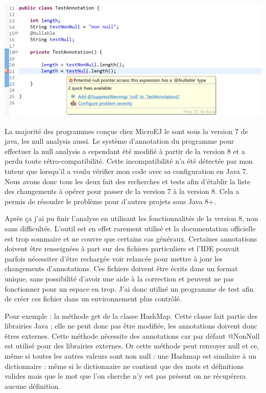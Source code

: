 \documentclass[french,a4paper,12pt]{report}
\begin{document}
\begin{center}
  \includegraphics[width=\textwidth]{ressources/images/nonnull.png}
\end{center}

La majorité des programmes conçus chez MicroEJ le sont sous la version 7 de java, les null analysis aussi. Le système d'annotation du programme pour effectuer la null analysis a cependant été modifié à partir de la version 8 et a perdu toute rétro-compatibilité. Cette incompatibilité n'a été détectée par mon tuteur que lorsqu'il a voulu vérifier mon code avec sa configuration en Java 7. Nous avons donc tous les deux fait des recherches et tests afin d'établir la liste des changements à opérer pour passer de la version 7 à la version 8. 
Cela a permis de résoudre le problème pour d'autres projets sous Java 8+.

Après ça j'ai pu finir l'analyse en utilisant les fonctionnalités de la version 8, non sans difficultés. L’outil est en effet rarement utilisé et la documentation officielle est trop sommaire et ne couvre que certains cas généraux. Certaines annotations doivent être renseignées à part sur des fichiers particuliers et l'IDE pouvait parfois nécessiter d'être rechargée voir relancée pour mettre à jour les changements d'annotations. Ces fichiers doivent être écrits dans un format unique, sans possibilité d'avoir une aide à la correction et peuvent ne pas fonctionner pour un espace en trop. J'ai donc utilisé un programme de test afin de créer ces fichier dans un environnement plus contrôlé.

Pour exemple : la méthode get de la classe HashMap. Cette classe fait partie des librairies Java ; elle ne peut donc pas être modifiée, les annotations doivent donc êtres externes. Cette méthode nécessite des annotations car par défaut @NonNull est utilisé pour des librairies externes. Or cette méthode peut renvoyer null et ce, même si toutes les autres valeurs sont non null : une Hashmap est similaire à un dictionnaire : même si le dictionnaire ne contient que des mots et définitions valides mais que le mot que l'on cherche n'y est pas présent on ne récupérera aucune définition.
\end{document}

